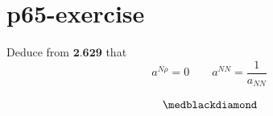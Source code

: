 \section{p65-exercise}
\begin{tcolorbox}
Deduce from $\textbf{2.629}$ that $$a^{N \rho} = 0  \quad\quad a^{NN} = \frac{1}{a_{NN}}$$
\end{tcolorbox}

$$\medblackdiamond$$
\newpage